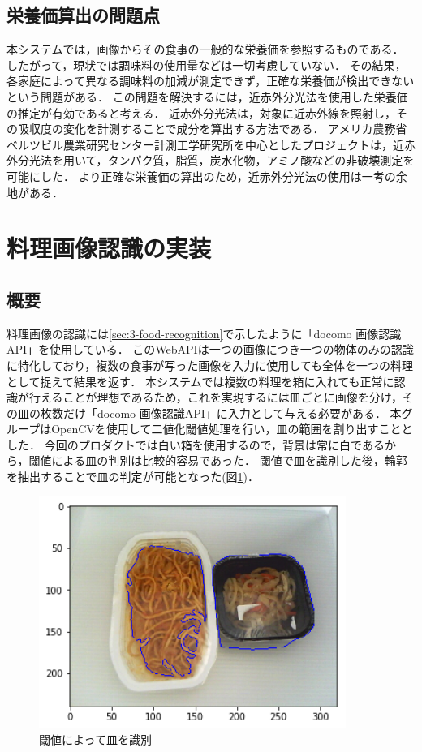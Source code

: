 \documentclass[../report]{subfiles}
\begin{document}
\subsection{栄養価算出の問題点}
本システムでは，画像からその食事の一般的な栄養価を参照するものである．
したがって，現状では調味料の使用量などは一切考慮していない．
その結果，各家庭によって異なる調味料の加減が測定できず，正確な栄養価が検出できないという問題がある．
この問題を解決するには，近赤外分光法を使用した栄養価の推定が有効であると考える．
近赤外分光法は，対象に近赤外線を照射し，その吸収度の変化を計測することで成分を算出する方法である．
アメリカ農務省ベルツビル農業研究センター計測工学研究所を中心としたプロジェクトは，近赤外分光法を用いて，タンパク質，脂質，炭水化物，アミノ酸などの非破壊測定を可能にした\cite{hooton}\cite{norris}．
より正確な栄養価の算出のため，近赤外分光法の使用は一考の余地がある．


\section{料理画像認識の実装} \label{sec:6-food-recognition}
\subsection{概要}
料理画像の認識には\ref{sec:3-food-recognition}で示したように「docomo 画像認識API」を使用している．
このWebAPIは一つの画像につき一つの物体のみの認識に特化しており，複数の食事が写った画像を入力に使用しても全体を一つの料理として捉えて結果を返す．
本システムでは複数の料理を箱に入れても正常に認識が行えることが理想であるため，これを実現するには皿ごとに画像を分け，その皿の枚数だけ「docomo 画像認識API」に入力として与える必要がある．
本グループはOpenCVを使用して二値化閾値処理を行い，皿の範囲を割り出すこととした．
今回のプロダクトでは白い箱を使用するので，背景は常に白であるから，閾値による皿の判別は比較的容易であった．
閾値で皿を識別した後，輪郭を抽出することで皿の判定が可能となった(図\ref{fig:6-threshold})．

\begin{figure}[htbp]
    \begin{center}
        \includegraphics[width=10cm]{imgs/6_threshold.png}
        \caption{閾値によって皿を識別}
        \label{fig:6-threshold}
    \end{center}
\end{figure}
\end{document}
